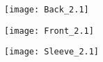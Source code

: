 \documentclass[portrait,a1,final]{a0poster}
\begin{document}
\begin{figure}[!ht]

\texttt{[image: Back\_2.1]}

\end{figure}

\clearpage
\begin{figure}[!ht]

\texttt{[image: Front\_2.1]}

\end{figure}

\clearpage
\begin{figure}[!ht]

\texttt{[image: Sleeve\_2.1]}

\end{figure}
\end{document}
